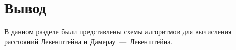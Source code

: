 \clearpage

\section*{Вывод}

В данном разделе были представлены схемы алгоритмов для вычисления расстояний Левенштейна и Дамерау~---~Левенштейна.